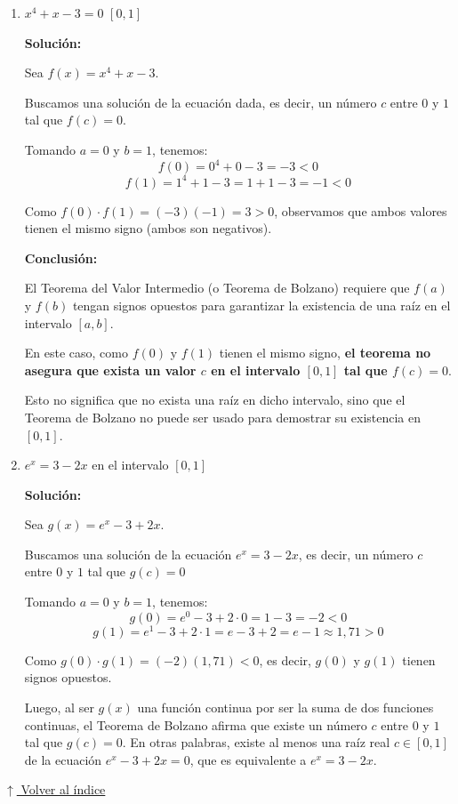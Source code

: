 \documentclass[12pt]{article}
\newcommand{\solucion}{%
    \vspace{0.8em}%
    \textbf{Solución:}%
}
\newcommand{\volverindice}{%
    \vspace{1em}%
    \begin{flushright}%
        \hyperlink{indice}{\small $\uparrow$ Volver al índice}%
    \end{flushright}%
}
\begin{document}
\begin{enumerate}[label=\alph*)]

    \item $x^4 + x - 3 = 0$ \quad $[0, 1]$

    \solucion

    Sea $f(x) = x^4 + x - 3$.

    Buscamos una solución de la ecuación dada, es decir, un número $c$ entre $0$ y $1$ tal que $f(c) = 0$.

    Tomando $a = 0$ y $b = 1$, tenemos:
    \[
    f(0) = 0^4 + 0 - 3 = -3 < 0
    \]
    \[
    f(1) = 1^4 + 1 - 3 = 1 + 1 - 3 = -1 < 0
    \]

    Como $f(0) \cdot f(1) = (-3)(-1) = 3 > 0$, observamos que ambos valores tienen el mismo signo (ambos son negativos).

    \textbf{Conclusión:}

    El Teorema del Valor Intermedio (o Teorema de Bolzano) requiere que $f(a)$ y $f(b)$ tengan signos opuestos para garantizar la existencia de una raíz en el intervalo $[a, b]$.

    En este caso, como $f(0)$ y $f(1)$ tienen el mismo signo, \textbf{el teorema no asegura que exista un valor $c$ en el intervalo $[0, 1]$ tal que $f(c) = 0$}.

    Esto no significa que no exista una raíz en dicho intervalo, sino que el Teorema de Bolzano no puede ser usado para demostrar su existencia en $[0, 1]$.
    
    \newpage
    \item $e^x = 3 - 2x$ en el intervalo $[0, 1]$

    \solucion

    Sea $g(x) = e^x - 3 + 2x$.

    Buscamos una solución de la ecuación $e^x = 3 - 2x$, es decir, un número $c$ entre $0$ y $1$ tal que $g(c) = 0$

    Tomando $a = 0$ y $b = 1$, tenemos:
    \[
    g(0) = e^0 - 3 + 2 \cdot 0 = 1 - 3 = -2 < 0
    \]
    \[
    g(1) = e^1 - 3 + 2 \cdot 1 = e - 3 + 2 = e - 1 \approx 1{,}71 > 0
    \]

    Como $g(0) \cdot g(1) = (-2)(1{,}71) < 0$, es decir, $g(0)$ y $g(1)$ tienen signos opuestos.

    Luego, al ser $g(x)$ una función continua por ser la suma de dos funciones continuas, el Teorema de Bolzano afirma que existe un número $c$ entre $0$ y $1$ tal que $g(c) = 0$. En otras palabras, existe al menos una raíz real $c \in [0,1]$ de la ecuación $e^x - 3 + 2x = 0$, que es equivalente a $e^x = 3 - 2x$.
\end{enumerate}
\volverindice
\newpage
\end{document}
